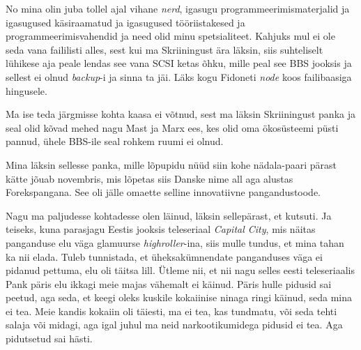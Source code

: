 
No mina olin juba tollel ajal vihane \emph{nerd}, igasugu 
programmeerimismaterjalid ja igasugused käsiraamatud ja igasugused 
tööriistakesed ja  programmeerimisvahendid ja need olid minu spetsialiteet. 
Kahjuks mul ei ole seda vana faililisti alles, sest kui ma Skriiningust ära 
läksin, siis suhteliselt lühikese aja peale lendas see vana SCSI ketas õhku, 
mille peal see BBS jooksis ja sellest ei olnud \emph{backup}-i ja sinna ta jäi. 
Läks kogu Fidoneti \emph{node} koos failibaasiga hingusele.

Ma ise teda järgmisse kohta kaasa ei võtnud, sest ma läksin Skriiningust panka 
ja seal olid kõvad mehed nagu Mast ja  Marx  ees, kes olid oma ökosüsteemi püsti pannud, ühele BBS-ile seal rohkem ruumi ei olnud. 


Mina läksin sellesse panka, mille lõpupidu nüüd siin kohe nädala-paari pärast 
kätte jõuab 
novembris, mis lõpetas siis Danske nime all aga alustas Forekspangana. See 
oli jälle omaette selline innovatiivne pangandustoode. 


Nagu ma paljudesse kohtadesse olen läinud, läksin sellepärast, et kutsuti. Ja 
teiseks, kuna parasjagu Eestis jooksis teleseriaal \emph{Capital City}, mis 
näitas panganduse elu väga glamuurse \emph{highroller}-ina, siis mulle tundus, 
et mina tahan ka nii elada. Tuleb tunnistada, et üheksakümnendate panganduses  
väga ei pidanud pettuma, elu oli täitsa lill. Ütleme nii, et nii nagu 
selles eesti teleseriaalis Pank päris elu ikkagi meie majas vähemalt ei käinud. 
Päris hulle pidusid sai peetud, aga seda, et keegi oleks kuskile kokaiinise  
ninaga ringi käinud, seda mina ei tea. Meie  kandis  kokaiin oli täiesti, ma 
ei tea, kas tundmatu, või seda tehti salaja või midagi, aga igal juhul ma neid 
narkootikumidega pidusid ei tea. Aga pidutsetud sai hästi.


